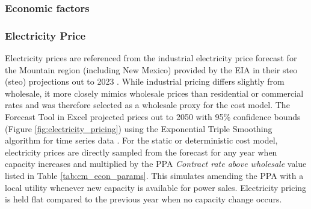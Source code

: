 \subsubsection{Economic factors}\label{ch4:econ_params}

\begin{table}[!htp]
\centering
{}
\caption[Cost model parameters for economics]{Parameters related to economic factors in the cost model}
\label{tab:cm_econ_params}
\end{table}

\subsubsection{Electricity Price}\label{ch4:elec_price}
Electricity prices are referenced from the industrial electricity price forecast for the Mountain region (including New Mexico) provided by the EIA in their \acrlong{steo} (\acrshort{steo}) projections out to 2023 \citep{eia_short-term_2021}. While industrial pricing differs slightly from wholesale, it more closely mimics wholesale prices than residential or commercial rates and was therefore selected as a wholesale proxy for the cost model. The Forecast Tool in Excel projected prices out to 2050 with 95\% confidence bounds (Figure \ref{fig:electricity_pricing}) using the Exponential Triple Smoothing algorithm for time series data \citep{microsoft_forecastets_2021}. For the static or deterministic cost model, electricity prices are directly sampled from the forecast for any year when capacity increases and multiplied by the PPA \textit{Contract rate above wholesale} value listed in Table \ref{tab:cm_econ_params}. This simulates amending the PPA with a local utility whenever new capacity is available for power sales. Electricity pricing is held flat compared to the previous year when no capacity change occurs.

